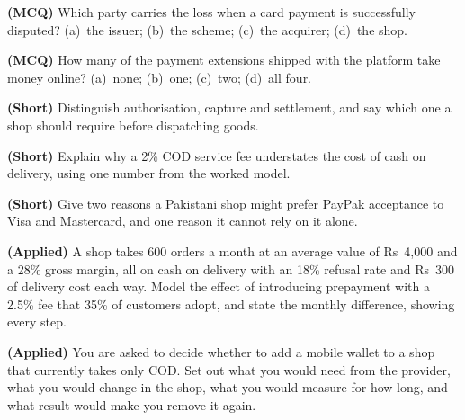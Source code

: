 \begin{reviewq}
  \item \textbf{(MCQ)} Which party carries the loss when a card payment is
        successfully disputed? (a)~the issuer; (b)~the scheme; (c)~the
        acquirer; (d)~the shop.
  \item \textbf{(MCQ)} How many of the payment extensions shipped with the
        platform take money online? (a)~none; (b)~one; (c)~two; (d)~all four.
  \item \textbf{(Short)} Distinguish authorisation, capture and settlement, and
        say which one a shop should require before dispatching goods.
  \item \textbf{(Short)} Explain why a 2\% COD service fee understates the cost
        of cash on delivery, using one number from the worked model.
  \item \textbf{(Short)} Give two reasons a Pakistani shop might prefer PayPak
        acceptance to Visa and Mastercard, and one reason it cannot rely on it
        alone.
  \item \textbf{(Applied)} A shop takes 600 orders a month at an average value
        of Rs~4{,}000 and a 28\% gross margin, all on cash on delivery with an
        18\% refusal rate and Rs~300 of delivery cost each way. Model the
        effect of introducing prepayment with a 2.5\% fee that 35\% of
        customers adopt, and state the monthly difference, showing every step.
  \item \textbf{(Applied)} You are asked to decide whether to add a mobile
        wallet to a shop that currently takes only COD. Set out what you would
        need from the provider, what you would change in the shop, what you
        would measure for how long, and what result would make you remove it
        again.
\end{reviewq}
